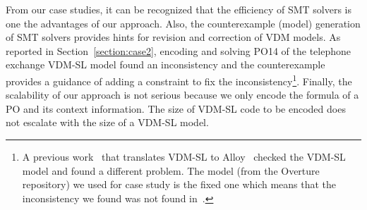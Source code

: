From our case studies, it can be recognized that the efficiency of SMT solvers is one the advantages of our approach. Also, the counterexample (model) generation of SMT solvers provides hints for revision and correction of VDM models. As reported in Section~\ref{section:case2}, encoding and solving PO14 of the telephone exchange VDM-SL model found an inconsistency and the counterexample provides a guidance of adding a constraint to fix the inconsistency\footnote{A previous work~\cite{kenneth:ifm2013} that translates VDM-SL to Alloy~\cite{kenneth:ifm2013} checked the VDM-SL model and found a different problem. The model (from the Overture repository) we used for case study is the fixed one which means that the inconsistency we found was not found in~\cite{kenneth:ifm2013}.}. Finally, the scalability of our approach is not serious because we only encode the formula of a PO and its context information. The size of VDM-SL code to be encoded does not escalate with the size of a VDM-SL model.


